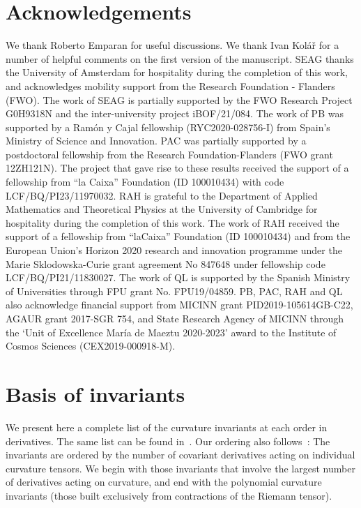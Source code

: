 \documentclass[11pt]{article}
\begin{document}
{\section*{Acknowledgements}
We thank Roberto Emparan for useful discussions. We thank Ivan Kol{\'a}{\v r} for a number of helpful comments on the first version of the manuscript. 
SEAG thanks the University of Amsterdam for hospitality during the completion of this work, and acknowledges mobility support from the Research Foundation - Flanders (FWO). The work of SEAG is partially supported by the FWO Research Project G0H9318N and the inter-university project iBOF/21/084. The work of PB was supported by a Ram\'on y Cajal fellowship (RYC2020-028756-I) from Spain’s Ministry of Science and Innovation. PAC was partially supported by a postdoctoral fellowship from the Research Foundation-Flanders (FWO grant 12ZH121N). The project that gave rise to these results received the support of a fellowship from ``la Caixa'' Foundation (ID 100010434) with code LCF/BQ/PI23/11970032. RAH is grateful to the Department of Applied Mathematics and Theoretical Physics at the University of Cambridge for hospitality during the completion of this work. The work of RAH received the support of a fellowship from ``laCaixa'' Foundation (ID 100010434) and from the European Union’s Horizon 2020 research and innovation programme under the Marie Sklodowska-Curie grant agreement No 847648 under fellowship code LCF/BQ/PI21/11830027. The work of QL is supported by the Spanish Ministry of Universities through FPU grant No. FPU19/04859.  PB, PAC, RAH and QL also acknowledge financial support from MICINN grant PID2019-105614GB-C22, AGAUR grant 2017-SGR 754, and State Research Agency of MICINN through the `Unit of Excellence María de Maeztu 2020-2023' award to the Institute of Cosmos Sciences (CEX2019-000918-M).




\appendix

\section{Basis of invariants}\label{basis}

We present here a complete list of the curvature invariants at each order in derivatives. The same list can be found in~\cite{Fulling:1992vm}. Our ordering also follows~\cite{Fulling:1992vm}: The invariants are ordered by the number of covariant derivatives acting on individual curvature tensors. We begin with those invariants that involve the largest number of derivatives acting on curvature, and end with the polynomial curvature invariants (those built exclusively from contractions of the Riemann tensor). 

}
\end{document}
